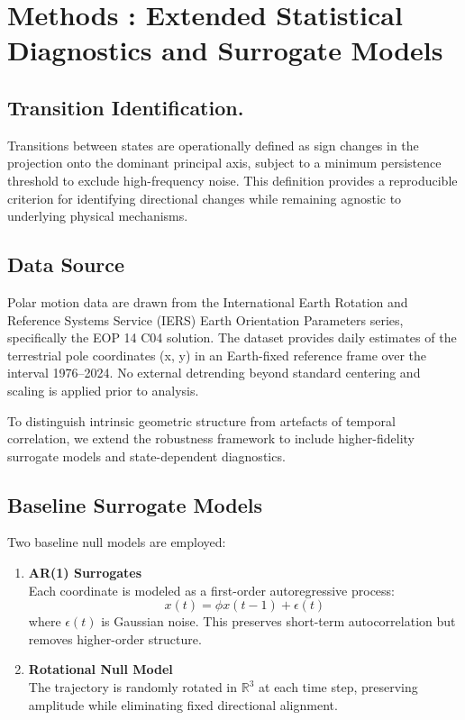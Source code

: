 \documentclass[twocolumn,9pt]{revtex4-2}
\begin{document}
\section{Methods
\label{sec:methods}: Extended Statistical Diagnostics and Surrogate Models}
\label{sec:methods}

\subsection{Transition Identification.}
\label{subsec:transition_identification}

Transitions between states are operationally defined as sign changes in the projection onto the dominant principal axis, subject to a minimum persistence threshold to exclude high-frequency noise. This definition provides a reproducible criterion for identifying directional changes while remaining agnostic to underlying physical mechanisms.

\subsection{Data Source}
\label{subsec:data_source}

Polar motion data are drawn from the International Earth Rotation and Reference Systems Service (IERS) Earth Orientation Parameters series, specifically the EOP 14 C04 solution. The dataset provides daily estimates of the terrestrial pole coordinates (x, y) in an Earth-fixed reference frame over the interval 1976--2024. No external detrending beyond standard centering and scaling is applied prior to analysis.

To distinguish intrinsic geometric structure from artefacts of temporal correlation, we extend the
robustness framework to include higher-fidelity surrogate models and state-dependent diagnostics.

\subsection{Baseline Surrogate Models}
\label{subsec:baseline_surrogate_models}

Two baseline null models are employed:

\begin{enumerate}
    \item \textbf{AR(1) Surrogates} \\
    Each coordinate is modeled as a first-order autoregressive process:
    \[
    x(t) = \phi x(t-1) + \epsilon(t)
    \]
    where $\epsilon(t)$ is Gaussian noise. This preserves short-term autocorrelation but removes
    higher-order structure.

    \item \textbf{Rotational Null Model} \\
    The trajectory is randomly rotated in $\mathbb{R}^3$ at each time step, preserving amplitude
    while eliminating fixed directional alignment.
\end{enumerate}
\end{document}
